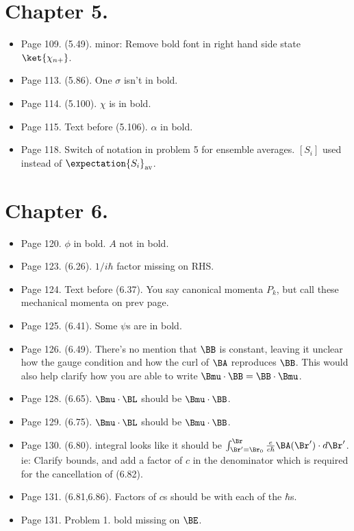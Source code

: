 \section{Chapter 5.}
\begin{itemize}
\item Page 109.  (5.49). minor: Remove bold font in right hand side state $\ket{\chi_{n+}}$.
\item Page 113.  (5.86). One $\sigma$ isn't in bold.
\item Page 114.  (5.100). $\chi$ is in bold.
\item Page 115.  Text before (5.106). $\alpha$ in bold.
\item Page 118.  Switch of notation in problem 5 for ensemble averages.  $[S_i]$ used instead of $\expectation{S_i}_{\text{av}}$.
\end{itemize}

\section{Chapter 6.}
\begin{itemize}
\item Page 120.  $\phi$ in bold.  $A$ not in bold.
\item Page 123.  (6.26).  $1/i \hbar$ factor missing on RHS.
\item Page 124.  Text before (6.37).  You say canonical momenta $P_k$, but call these mechanical momenta on prev page.
\item Page 125.  (6.41).  Some $\psi$s are in bold.
\item Page 126.  (6.49).  There's no mention that $\BB$ is constant, leaving it unclear how the gauge condition and how the curl of $\BA$ reproduces $\BB$.  This would also help clarify how you are able to write $\Bmu \cdot \BB = \BB \cdot \Bmu$.
\item Page 128.  (6.65).  $\Bmu \cdot \BL$ should be $\Bmu \cdot \BB$.
\item Page 129.  (6.75).  $\Bmu \cdot \BL$ should be $\Bmu \cdot \BB$.
\item Page 130.  (6.80).  integral looks like it should be $\int_{\Br' = \Br_0}^\Br \frac{e}{c \hbar} \BA(\Br') \cdot d\Br'$.  ie: Clarify bounds, and add a factor of $c$ in the denominator which is required for the cancellation of (6.82).
\item Page 131.  (6.81,6.86).  Factors of $c$s should be with each of the $\hbar$s.
\item Page 131.  Problem 1.  bold missing on $\BE$.
\end{itemize}

